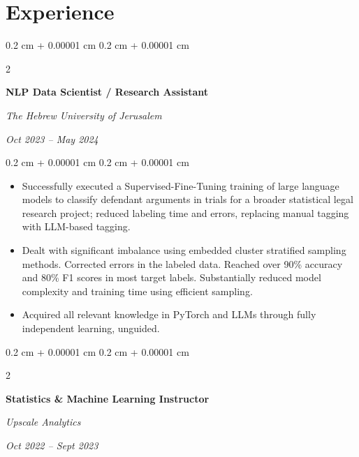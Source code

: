 \documentclass[10pt, letterpaper]{article}
\newenvironment{highlights}{
    \begin{itemize}[
        topsep=0.10 cm,
        parsep=0.10 cm,
        partopsep=0pt,
        itemsep=0pt,
        leftmargin=0.4 cm + 10pt
    ]
}{
    \end{itemize}
} %
\newenvironment{onecolentry}{
    \begin{adjustwidth}{
        0.2 cm + 0.00001 cm
    }{
        0.2 cm + 0.00001 cm
    }
}{
    \end{adjustwidth}
} %
\newenvironment{twocolentry}[2][]{
    \onecolentry
    \def\secondColumn{#2}
    \setcolumnwidth{\fill, 4.5 cm}
    \begin{paracol}{2}
}{
    \switchcolumn \raggedleft \secondColumn
    \end{paracol}
    \endonecolentry
} %
\begin{document}
    \section{Experience}



        
        \begin{twocolentry}{
            
            
        \textit{Oct 2023 – May 2024}}
            \textbf{NLP Data Scientist / Research Assistant}
            
            \textit{The Hebrew University of Jerusalem}
        \end{twocolentry}

        \vspace{0.10 cm}
        \begin{onecolentry}
            \begin{highlights}
                \item Successfully executed a Supervised-Fine-Tuning training of large language models to classify defendant arguments in trials for a broader statistical legal research project; reduced labeling time and errors, replacing manual tagging with LLM-based tagging.
                \item Dealt with significant imbalance using embedded cluster stratified sampling methods. Corrected errors in the labeled data. Reached over 90\% accuracy and 80\% F1 scores in most target labels. Substantially reduced model complexity and training time using efficient sampling.
                \item Acquired all relevant knowledge in PyTorch and LLMs through fully independent learning, unguided.
            \end{highlights}
        \end{onecolentry}


        \vspace{0.2 cm}

        \begin{twocolentry}{
            
            
        \textit{Oct 2022 – Sept 2023}}
            \textbf{Statistics \& Machine Learning Instructor}
            
            \textit{Upscale Analytics}
        \end{twocolentry}
\end{document}

